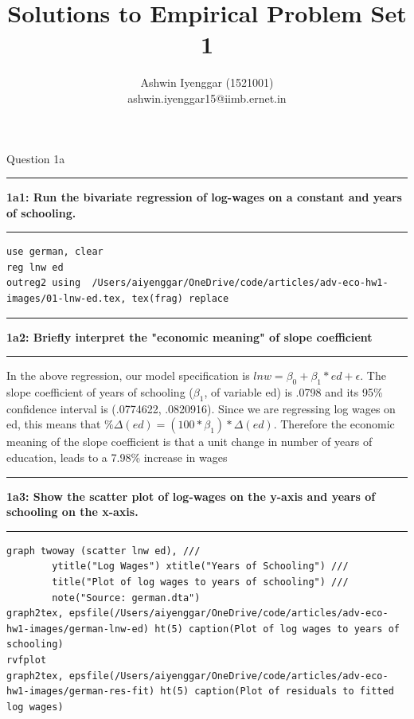 \documentclass[12pt]{article}
\newcommand\question[2]{\vspace{1em}\hrule\vspace{1em}\textbf{#1: #2}\vspace{1em}\hrule\vspace{1em}}
\begin{document}
\title{Solutions to Empirical Problem Set 1}
\author{Ashwin Iyenggar  (1521001) \\ ashwin.iyenggar15@iimb.ernet.in} 


\maketitle
\thispagestyle{empty}


\begin{center}\LARGE{Question 1a}\end{center}

\question{1a1}{Run the bivariate regression of log-wages on a constant and years of schooling.}
\begin{lstlisting}
use german, clear
reg lnw ed
outreg2 using  /Users/aiyenggar/OneDrive/code/articles/adv-eco-hw1-images/01-lnw-ed.tex, tex(frag) replace
\end{lstlisting}




\question{1a2}{Briefly interpret the "economic meaning" of slope coefficient}
In the above regression, our model specification is $lnw = \beta_0 + \beta_1 * ed + \epsilon$.
The slope coefficient of years of schooling ($\beta_1$, of variable ed) is .0798 and its 95\% confidence interval is (.0774622, .0820916). Since we are regressing log wages on ed, this means that $\%\Delta(ed) = (100*\beta_1)*\Delta(ed)$. Therefore the  economic meaning of the slope coefficient is that a unit change in number of years of education, leads to a 7.98\% increase in wages

\question{1a3}{Show the scatter plot of log-wages on the y-axis and years of schooling on the x-axis.}
\begin{lstlisting}
graph twoway (scatter lnw ed), ///
        ytitle("Log Wages") xtitle("Years of Schooling") ///
        title("Plot of log wages to years of schooling") ///
        note("Source: german.dta")
graph2tex, epsfile(/Users/aiyenggar/OneDrive/code/articles/adv-eco-hw1-images/german-lnw-ed) ht(5) caption(Plot of log wages to years of schooling)
rvfplot
graph2tex, epsfile(/Users/aiyenggar/OneDrive/code/articles/adv-eco-hw1-images/german-res-fit) ht(5) caption(Plot of residuals to fitted log wages)
\end{lstlisting}
\end{document}
